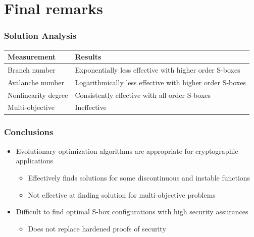 \documentclass[handout]{beamer}
\begin{document}
\section{Final remarks}
\begin{frame}
	\frametitle{Solution Analysis}
\begin{table}
    \begin{tabular}{|l|p{6cm}|}
        \hline
        \textbf{Measurement} & \textbf{Results} \\ \hline
        Branch number & Exponentially less effective with higher order S-boxes \\ 
        Avalanche number & Logarithmically less effective with higher order S-boxes \\ 
        Nonlinearity degree & Consistently effective with all order S-boxes  \\ \hline
	Multi-objective & Ineffective \\
        \hline
    \end{tabular}
\end{table}
\end{frame}

\begin{frame}
	\frametitle{Conclusions}
	\begin{itemize}
		\item Evolutionary optimization algorithms are appropriate for cryptographic applications
		\begin{itemize}
			\item Effectively finds solutions for some discontinuous and instable functions
			\item Not effective at finding solution for multi-objective problems
		\end{itemize}
		\item Difficult to find optimal S-box configurations with high security assurances
		\begin{itemize}
			\item Does not replace hardened proofs of security
		\end{itemize}
	\end{itemize}
\end{frame}
\end{document}
